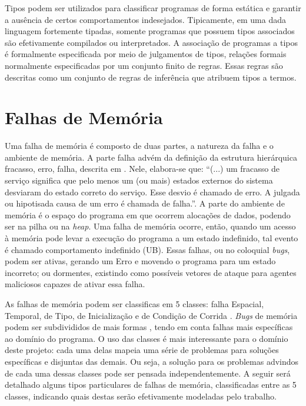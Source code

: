 Tipos podem ser utilizados para classificar programas de forma estática e garantir a ausência de certos comportamentos indesejados. Tipicamente, em uma dada linguagem fortemente tipadas, somente programas que possuem tipos associados são efetivamente compilados ou interpretados. A associação de programas a tipos é formalmente especificada por meio de julgamentos de tipos, relações formais normalmente especificadas por um conjunto finito de regras. Essas regras são descritas como um conjunto de regras de inferência que atribuem tipos a termos. 


\section{Falhas de Memória}
\label{sec:mem-error}

Uma falha de memória é composto de duas partes, a natureza da falha e o ambiente de memória. A parte falha advém da definição da estrutura hierárquica fracasso, erro, falha, descrita em \citet{FAULTS}. Nele, elabora-se que: ``(...) um fracasso de serviço significa que pelo menos um (ou mais) estados externos do sistema desviaram do estado correto do serviço. Esse desvio é chamado de erro. A julgada ou hipotisada causa de um erro é chamada de falha.''\cite[p. 13, tradução nossa.]{FAULTS}. A parte do ambiente de memória é o espaço do programa em que ocorrem alocações de dados, podendo ser na pilha ou na \emph{heap}. Uma falha de memória ocorre, então, quando um acesso à memória pode levar a execução do programa a um estado indefinido, tal evento é chamado comportamento indefinido (UB). Essas falhas, ou no coloquial \emph{bugs}, podem ser ativas, gerando um Erro e movendo o programa para um estado incorreto; ou dormentes, existindo como possíveis vetores de ataque para agentes maliciosos capazes de ativar essa falha. 

As falhas de memória podem ser classificas em 5 classes: falha Espacial, Temporal, de Tipo, de Inicialização e de Condição de Corrida \cite{Apple22,Google24}. \emph{Bugs} de memória podem ser subdivididos de mais formas \cite{7KINGDOMS,CWELIST}, tendo em conta falhas mais específicas ao domínio do programa.  O uso das classes é mais interessante para o domínio deste projeto: cada uma delas mapeia uma série de problemas para soluções específicas e disjuntas das demais.  Ou seja, a solução para os problemas advindos de cada uma dessas classes pode ser pensada independentemente. A seguir será detalhado alguns tipos particulares de falhas de memória, classificadas entre as 5 classes, indicando quais destas serão efetivamente modeladas pelo trabalho.

